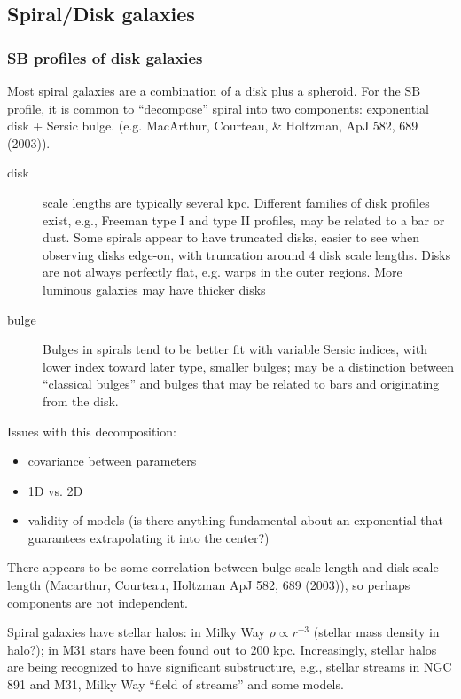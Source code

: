 \documentclass{article}
\newcommand{\mynotes}[1]{\textcolor{cadmiumgreen}{#1}}
\begin{document}
\subsection{Spiral/Disk galaxies}

\subsubsection{SB profiles of disk galaxies}
Most spiral galaxies are a combination of a disk plus a spheroid. For the SB
profile, it is common to ``decompose'' spiral into two components: exponential
disk + Sersic bulge.
(e.g. MacArthur, Courteau, \& Holtzman, ApJ 582, 689 (2003)).
\begin{description}
    \item [disk] scale lengths are typically several kpc. Different families of
        disk profiles exist, e.g., Freeman type I and type II profiles, may be
        related to a bar or dust. Some spirals appear to have truncated disks,
        easier to see when observing disks edge-on, with truncation around 4
        disk scale lengths. Disks are not always perfectly flat, e.g. warps in
        the outer regions.
        More luminous galaxies may have thicker disks
    \item [bulge] Bulges in spirals tend to be better fit with variable Sersic
        indices, with lower index toward later type, smaller bulges; may be a
        distinction between ``classical bulges'' and bulges that may be related
        to bars and originating from the disk.
\end{description}
Issues with this decomposition:
\begin{itemize}
    \item covariance between parameters
    \item 1D vs. 2D
    \item validity of models (is there anything fundamental about an
        exponential that guarantees extrapolating it into the center?)
\end{itemize}
There appears to be some correlation between bulge scale length and disk scale
length (Macarthur, Courteau, Holtzman ApJ 582, 689 (2003)), so perhaps
components are not independent.

Spiral galaxies have stellar halos: in Milky Way  $\rho \propto r^{-3}$
\mynotes{(stellar mass density in halo?)};
in M31 stars have been found out to 200 kpc. Increasingly, stellar halos are
being recognized to have significant substructure, e.g., stellar streams in
NGC 891 and M31, Milky Way ``field of streams'' and some models.
\end{document}
